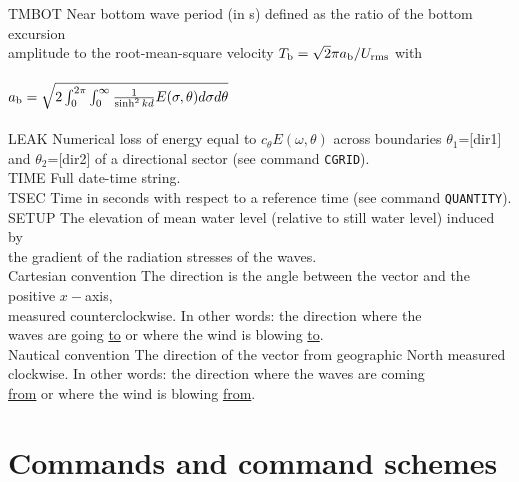\documentclass[12pt]{book}
\begin{document}
\begin{tabbing}
TMBOT                \> Near bottom wave period (in s) defined as the ratio of the bottom excursion\+\\
                        amplitude to the root-mean-square velocity $T_{\rm b} = \sqrt{2}\pi a_{\rm b}/U_{\rm rms}$ with\\
                        \\
$a_{\rm b} = \sqrt{2\int_{0}^{2\pi} \int_{0}^{\infty} \frac{1}{\sinh^2 kd} E(\sigma,\theta) d\sigma d\theta}$
                        \\
                        \-\\
LEAK                 \> Numerical loss of energy equal to $c_{\theta}E(\omega,\theta)$ across boundaries $\theta_1$=[dir1]\+\\
                        and $\theta_2$=[dir2] of a directional sector (see command {\tt CGRID}).\-\\
TIME                 \> Full date-time string.\\
TSEC                 \> Time in seconds with respect to a reference time (see command {\tt QUANTITY}).\\
SETUP                \> The elevation of mean water level (relative to still water level) induced by\+\\
                        the gradient of the radiation stresses of the waves.\-\\
Cartesian convention \> The direction is the angle between the vector and the positive $x-$axis,\+\\
                        measured counterclockwise. In other words: the direction where the\\
                        waves are going {\underline {to}} or where the wind is blowing {\underline {to}}.\-\\
Nautical convention  \> The direction of the vector from geographic North measured\+\\
                        clockwise. In other words: the direction where the waves are coming\\
                        {\underline {from}} or where the wind is blowing {\underline {from}}.\-\\
\end{tabbing}

 \label{app:syntax}

\section{Commands and command schemes}
\end{document}
